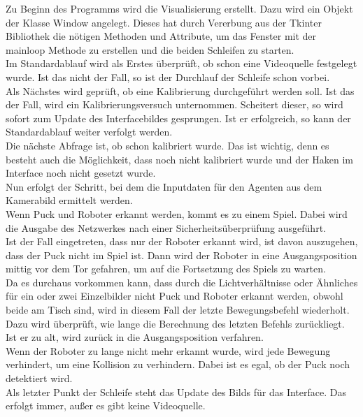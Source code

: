 Zu Beginn des Programms wird die Visualisierung erstellt. Dazu wird ein Objekt der Klasse Window angelegt. Dieses hat durch Vererbung aus der Tkinter Bibliothek die nötigen Methoden und Attribute, um das Fenster mit der mainloop Methode zu erstellen und die beiden Schleifen zu starten. \\
Im Standardablauf wird als Erstes überprüft, ob schon eine Videoquelle festgelegt wurde. Ist das nicht der Fall, so ist der Durchlauf der Schleife schon vorbei. \\
Als Nächstes wird geprüft, ob eine Kalibrierung durchgeführt werden soll. Ist das der Fall, wird ein Kalibrierungsversuch unternommen. Scheitert dieser, so wird sofort zum Update des Interfacebildes gesprungen. Ist er erfolgreich, so kann der Standardablauf weiter verfolgt werden.\\
Die nächste Abfrage ist, ob schon kalibriert wurde. Das ist wichtig, denn es besteht auch die Möglichkeit, dass noch nicht kalibriert wurde und der Haken im Interface noch nicht gesetzt wurde.\\
Nun erfolgt der Schritt, bei dem die Inputdaten für den Agenten aus dem Kamerabild ermittelt werden.\\
Wenn Puck und Roboter erkannt werden, kommt es zu einem Spiel. Dabei wird die Ausgabe des Netzwerkes nach einer Sicherheitsüberprüfung ausgeführt.\\
Ist der Fall eingetreten, dass nur der Roboter erkannt wird, ist davon auszugehen, dass der Puck nicht im Spiel ist. Dann wird der Roboter in eine Ausgangsposition mittig vor dem Tor gefahren, um auf die Fortsetzung des Spiels zu warten.\\
Da es durchaus vorkommen kann, dass durch die Lichtverhältnisse oder Ähnliches für ein oder zwei Einzelbilder nicht Puck und Roboter erkannt werden, obwohl beide am Tisch sind, wird in diesem Fall der letzte Bewegungsbefehl wiederholt. Dazu wird überprüft, wie lange die Berechnung des letzten Befehls zurückliegt. Ist er zu alt, wird zurück in die Ausgangsposition verfahren.\\
Wenn der Roboter zu lange nicht mehr erkannt wurde, wird jede Bewegung verhindert, um eine Kollision zu verhindern. Dabei ist es egal, ob der Puck noch detektiert wird.\\
Als letzter Punkt der Schleife steht das Update des Bilds für das Interface. Das erfolgt immer, außer es gibt keine Videoquelle.\\

